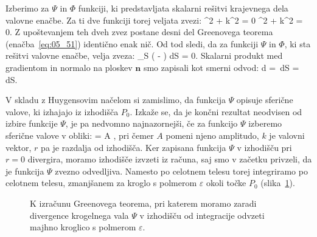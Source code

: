 Izberimo za $\Psi$ in $\Phi$ funkciji, ki predstavljata skalarni rešitvi
krajevnega dela valovne enačbe. Za ti dve funkciji torej veljata zvezi:
\beq
\nabla^2 \Psi + k^2 \Psi = 0 \qquad {} \qquad \nabla^2 \Phi + k^2 \Phi = 0.
\label{eq:05_52}
\eeq
Z upoštevanjem teh dveh zvez postane desni del Greenovega teorema 
(enačba~\ref{eq:05_51}) identično enak nič. Od tod sledi, da za funkciji $\Psi$ in $\Phi$,
ki sta rešitvi valovne enačbe, velja zveza:
\beq
\oint_S \left( \Psi{} -
\Phi{} \right) dS = 0.
\label{eq:05_53}
\eeq
Skalarni produkt med gradientom in normalo na ploskev $\mathbf{n}$ smo
zapisali kot smerni odvod:
\beq
\nabla\Phi \cdot d = \nabla \Phi \cdot {}\,dS = 
\,dS.
\label{eq:05_53a}
\eeq

V skladu z Huygensovim  načelom si zamislimo, da funkcija $\Psi$ opisuje sferične valove, ki
izhajajo iz izhodišča $P_0$. Izkaže se, da je končni rezultat neodvisen od izbire
funkcije $\Psi$, je pa nedvomno najnazornejši, če za funkcijo $\Psi$ 
izberemo sferične valove v obliki:
\beq
\Psi = A ,
\label{eq:05_54}
\eeq
pri čemer $A$ pomeni njeno amplitudo, $k$ je valovni vektor, $r$ pa je 
razdalja od izhodišča. Ker zapisana funkcija $\Psi$ 
v izhodišču pri $r=0$ divergira, moramo izhodišče
izvzeti iz računa, saj smo v začetku privzeli, da je funkcija $\Psi$
zvezno odvedljiva. Namesto po celotnem telesu torej integriramo 
po celotnem telesu, zmanjšanem za kroglo s 
polmerom $\varepsilon$ okoli točke $P_0$ (slika~\ref{fig:05_Green}).
\begin{figure}[ht]
\centering
\def\svgwidth{70truemm} 

\caption{K izračunu Greenovega teorema, pri katerem moramo zaradi divergence krogelnega
vala $\Psi$ v izhodišču od integracije odvzeti majhno kroglico s polmerom $\varepsilon$.}
\label{fig:05_Green}
\end{figure}

